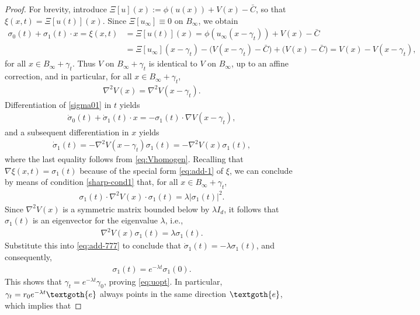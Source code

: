 \documentclass[reqno]{amsart}
\begin{document}
\begin{proof}
  For brevity, introduce $\Xi[u](x) := \phi(u(x))+V(x)-\bar C$,
  so that $\xi(x,t) = \Xi[u(t)](x)$.
  Since $\Xi[u_\infty]\equiv0$ on $B_\infty$, we obtain
  \begin{align}\label{sigma01}
    \sigma_0(t)+\sigma_1(t)\cdot x
    = \xi(x,t)
    &= \Xi[u(t)](x)
      = \phi(u_\infty(x-\gamma_t))+V(x)-\bar C \\
    & = \Xi[u_\infty](x-\gamma_t)-\big(V(x-\gamma_t)-\bar C\big)+\big(V(x)-\bar C\big)
      = V(x) - V(x-\gamma_t), \nonumber
  \end{align}
  for all $x\in B_\infty+\gamma_t$. Thus $V$ on $B_\infty+\gamma_t$ is identical to $V$ on $B_\infty$, up to an affine correction, and in particular, for all $x\in B_\infty+\gamma_t$,
  \begin{align}
    \label{eq:Vhomogen}
    \nabla^2V(x) = \nabla^2V(x-\gamma_t).
  \end{align}
  Differentiation of \eqref{sigma01} in $t$ yields
  \begin{align*}
    \dot\sigma_0(t) + \dot\sigma_1(t)\cdot x
    = -\sigma_1(t)\cdot\nabla V(x-\gamma_t),
  \end{align*}
  and a subsequent differentiation in $x$ yields
  \begin{align}
    \label{eq:add-777}
    \dot\sigma_1(t) = -\nabla^2V(x-\gamma_t)\sigma_1(t) = -\nabla^2V(x) \sigma_1(t),
  \end{align}
  where the last equality follows from \eqref{eq:Vhomogen}. Recalling that $\nabla\xi(x,t)=\sigma_1(t)$ because of the special form \eqref{eq:add-1} of $\xi$, we can conclude by means of condition \eqref{sharp-cond1} that, for all $x\in B_\infty+\gamma_t$,
  \begin{align}
    \label{eq:add-13}
    \sigma_1(t)\cdot\nabla^2V(x)\cdot\sigma_1(t) = \lambda|\sigma_1(t)|^2.
  \end{align}
  Since $\nabla^2V(x)$ is a symmetric matrix bounded below by $\lambda I_d$, it follows that $\sigma_1(t)$ is an eigenvector for the eigenvalue $\lambda$, i.e.,
  \begin{align*}
    \nabla^2V(x)\sigma_1(t) = \lambda\sigma_1(t).
  \end{align*}
  Substitute this into \eqref{eq:add-777} to conclude that $\dot\sigma_1(t) = -\lambda\sigma_1(t)$, and consequently,
  \begin{align*}
    \sigma_1(t) = e^{-\lambda t}\sigma_1(0).
  \end{align*}
  This shows that $\gamma_t=e^{-\lambda t}\gamma_0$, proving \eqref{eq:uopt}. In particular, $\gamma_t=r_0e^{-\lambda t}\textgoth{e}$ always points in the same direction $\textgoth{e}$, which implies that

\end{proof}
\end{document}
